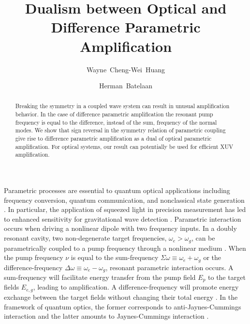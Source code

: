\documentclass[aps,prl,nobibnotes,nofootinbib,showpacs,reprint]{revtex4-1}
\newcommand{\we}{\omega_{e}}
\newcommand{\wg}{\omega_{g}}
\newcommand{\Dw}{\Delta \omega}
\newcommand{\Sw}{\Sigma \omega}
\begin{document}
\title{Dualism between Optical and Difference Parametric Amplification}

\author{Wayne~Cheng-Wei~Huang}

\author{Herman~Batelaan}



\begin{abstract}

Breaking the symmetry in a coupled wave system can result in unusual amplification behavior. In the case of difference parametric amplification the resonant pump frequency is equal to the difference, instead of the sum, frequency of the normal modes. We show that sign reversal in the symmetry relation of parametric coupling give rise to difference parametric amplification as a dual of optical parametric amplification. For optical systems, our result can potentially be used for efficient XUV amplification.

\end{abstract}


\maketitle 

Parametric processes are essential to quantum optical applications including frequency conversion, quantum communication, and nonclassical state generation \cite{Dutt, Ma, Meekhof, Vlastakis}. In particular, the application of squeezed light in precision measurement has led to enhanced sensitivity for gravitational wave detection \cite{LIGO}. Parametric interaction occurs when driving a nonlinear dipole with two frequency inputs. In a doubly resonant cavity, two non-degenerate target frequencies, $\we > \wg$, can be parametrically coupled to a pump frequency through a nonlinear medium \cite{Colville, Rivoire}. When the pump frequency $\nu$ is equal to the sum-frequency $\Sw \equiv \we + \wg$ or the difference-frequency $\Dw \equiv \we - \wg$, resonant parametric interaction occurs. A sum-frequency will facilitate energy transfer from the pump field $E_{p}$ to the target fields $E_{e,g}$, leading to amplification. A difference-frequency will promote energy exchange between the target fields without changing their total energy \cite{Boyd}. In the framework of quantum optics, the former corresponds to anti-Jaynes-Cummings interaction and the latter amounts to Jaynes-Cummings interaction \cite{Kippenberg, Gerry}. 
 
\end{document}
